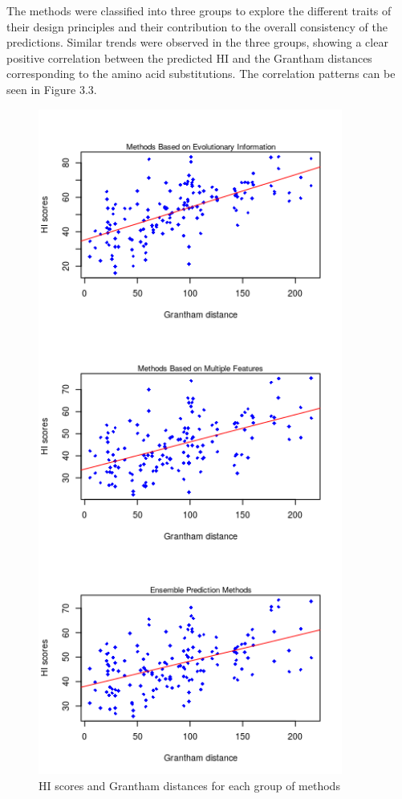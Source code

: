 \documentclass[12pt,MSc,wordcount,anon]{muthesis}
\begin{document}
\begin{flushleft}
The methods were classified into three groups to explore the different traits of their design principles and their contribution to the overall consistency of the predictions. Similar trends were observed in the three groups, showing a clear positive correlation between the predicted HI and the Grantham distances corresponding to the amino acid substitutions. The correlation patterns can be seen in Figure 3.3.

\begin{figure}
\begin{center}
\includegraphics[width=10cm]{img/scatter_plots}
\end{center}
\caption{HI scores and Grantham  distances for each group of methods}
\label{fig:fig-eg}  
\end{figure}


\end{flushleft}
\end{document}
